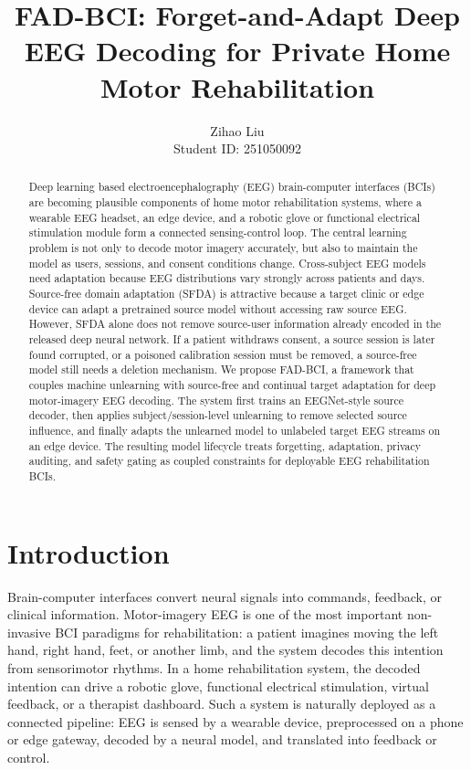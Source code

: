 \documentclass[10pt,twocolumn]{article}
\title{FAD-BCI: Forget-and-Adapt Deep EEG Decoding for Private Home Motor Rehabilitation}
\author{Zihao Liu\\Student ID: 251050092}
\date{}
\begin{document}
\maketitle
\begin{abstract}
Deep learning based electroencephalography (EEG) brain-computer interfaces (BCIs) are becoming plausible components of home motor rehabilitation systems, where a wearable EEG headset, an edge device, and a robotic glove or functional electrical stimulation module form a connected sensing-control loop. The central learning problem is not only to decode motor imagery accurately, but also to maintain the model as users, sessions, and consent conditions change. Cross-subject EEG models need adaptation because EEG distributions vary strongly across patients and days. Source-free domain adaptation (SFDA) is attractive because a target clinic or edge device can adapt a pretrained source model without accessing raw source EEG. However, SFDA alone does not remove source-user information already encoded in the released deep neural network. If a patient withdraws consent, a source session is later found corrupted, or a poisoned calibration session must be removed, a source-free model still needs a deletion mechanism. We propose FAD-BCI, a framework that couples machine unlearning with source-free and continual target adaptation for deep motor-imagery EEG decoding. The system first trains an EEGNet-style source decoder, then applies subject/session-level unlearning to remove selected source influence, and finally adapts the unlearned model to unlabeled target EEG streams on an edge device. The resulting model lifecycle treats forgetting, adaptation, privacy auditing, and safety gating as coupled constraints for deployable EEG rehabilitation BCIs.
\end{abstract}

\section{Introduction}
Brain-computer interfaces convert neural signals into commands, feedback, or clinical information. Motor-imagery EEG is one of the most important non-invasive BCI paradigms for rehabilitation: a patient imagines moving the left hand, right hand, feet, or another limb, and the system decodes this intention from sensorimotor rhythms. In a home rehabilitation system, the decoded intention can drive a robotic glove, functional electrical stimulation, virtual feedback, or a therapist dashboard. Such a system is naturally deployed as a connected pipeline: EEG is sensed by a wearable device, preprocessed on a phone or edge gateway, decoded by a neural model, and translated into feedback or control.
\end{document}
